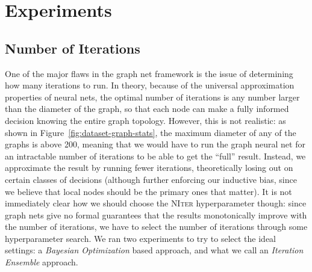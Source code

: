 \section{Experiments}
\label{sec:experiments}

\subsection{Number of Iterations}
One of the major flaws in the graph net framework is the issue of determining how many iterations to run.
In theory, because of the universal approximation properties of neural nets, the optimal number of iterations is any number larger than the diameter of the graph, so that each node can make a fully informed decision knowing the entire graph topology.
However, this is not realistic: as shown in Figure~\ref{fig:dataset-graph-stats}, the maximum diameter of any of the graphs is above 200, meaning that we would have to run the graph neural net for an intractable number of iterations to be able to get the ``full'' result.
Instead, we approximate the result by running fewer iterations, theoretically losing out on certain classes of decisions (although further enforcing our inductive bias, since we believe that local nodes should be the primary ones that matter).
It is not immediately clear how we should choose the \textsc{NIter} hyperparameter though: since graph nets give no formal guarantees that the results monotonically improve with the number of iterations, we have to select the number of iterations through some hyperparameter search.
We ran two experiments to try to select the ideal settings: a \emph{Bayesian Optimization} based approach, and what we call an \emph{Iteration Ensemble} approach.


